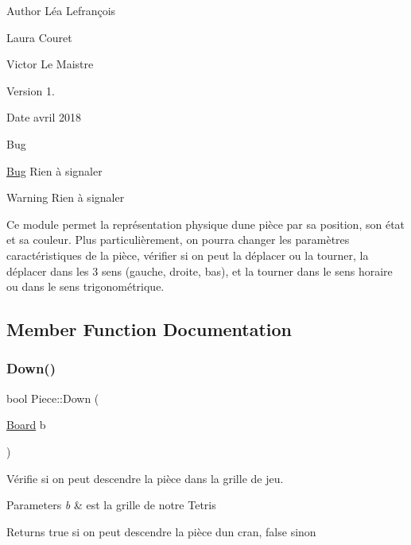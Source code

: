 \begin{DoxyAuthor}{Author}
Léa Lefrançois 

Laura Couret 

Victor Le Maistre 
\end{DoxyAuthor}
\begin{DoxyVersion}{Version}
1. 
\end{DoxyVersion}
\begin{DoxyDate}{Date}
avril 2018 
\end{DoxyDate}
\begin{DoxyRefDesc}{Bug}
\item[\hyperlink{bug__bug000008}{Bug}]Rien à signaler \end{DoxyRefDesc}
\begin{DoxyWarning}{Warning}
Rien à signaler
\end{DoxyWarning}
Ce module permet la représentation physique d\textquotesingle{}une pièce par sa position, son état et sa couleur. Plus particulièrement, on pourra changer les paramètres caractéristiques de la pièce, vérifier si on peut la déplacer ou la tourner, la déplacer dans les 3 sens (gauche, droite, bas), et la tourner dans le sens horaire ou dans le sens trigonométrique. 

\subsection{Member Function Documentation}
\mbox{\label{classPiece_ad48708c0bbee0b0a583f00e56808b1d2}} 
\subsubsection{\texorpdfstring{Down()}{Down()}}
{\footnotesize\ttfamily bool Piece\+::\+Down (\begin{DoxyParamCaption}\item[{\hyperlink{classBoard}{Board}}]{b }\end{DoxyParamCaption})}



Vérifie si on peut descendre la pièce dans la grille de jeu. 


\begin{DoxyParams}{Parameters}
{\em b} & est la grille de notre Tetris \\
\hline
\end{DoxyParams}
\begin{DoxyReturn}{Returns}
true si on peut descendre la pièce d\textquotesingle{}un cran, false sinon 
\end{DoxyReturn}
\mbox{\label{classPiece_aa5f13b2ce17fdf29dca28b0455f7b73a}} 
